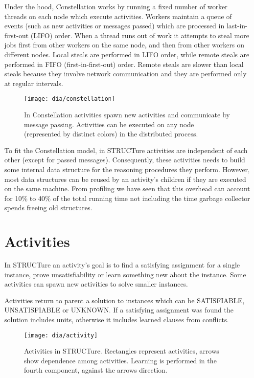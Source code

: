 Under the hood, Constellation works by running a fixed number of
worker threads on each node which execute activities.  Workers
maintain a queue of events (such as new activities or messages
passed) which are processed in last-in-first-out (LIFO) order.
When a thread runs out of work it attempts to steal more jobs first
from other workers on the same node, and then from other workers
on different nodes.  Local steals are performed in LIFO order,
while remote steals are performed in FIFO (first-in-first-out)
order. Remote steals are slower than local steals because they
involve network communication and they are performed only at
regular intervals.

\begin{figure}
  \centering
  \texttt{[image: dia/constellation]}
  \caption{In Constellation activities spawn new
  activities and communicate by message passing.
  Activities can be executed on any node (represented by
  distinct colors) in the distributed process.}
  \label{fig:constellation}
\end{figure}


To fit the Constellation model, in STRUCTure activities are
independent of each other (except for passed messages). Consequently,
these activities needs to build some internal data structure for
the reasoning procedures they perform. However, most data structures
can be reused by an activity's children if they are executed on the
same machine. From profiling we have seen that this overhead can
account for 10\% to 40\% of the total running time not including
the time garbage collector spends freeing old structures.

\section{Activities}

In STRUCTure an activity's goal is to find a satisfying assignment
for a single instance, prove unsatisfiability or learn something new
about the instance. Some activities can spawn new activities to
solve smaller instances.

Activities return to parent a solution to instances which can be
\textsf{SATISFIABLE}, \textsf{UNSATISFIABLE} or \textsf{UNKNOWN}. If
a satisfying assignment was found the solution includes units,
otherwise it includes learned clauses from conflicts.

\begin{figure}
  \centering
  \texttt{[image: dia/activity]}
  \caption{Activities in STRUCTure. Rectangles represent activities,
  arrows show dependence among activities. Learning is
  performed in the fourth component, against the arrows direction.}
  \label{fig:activities}
\end{figure}



